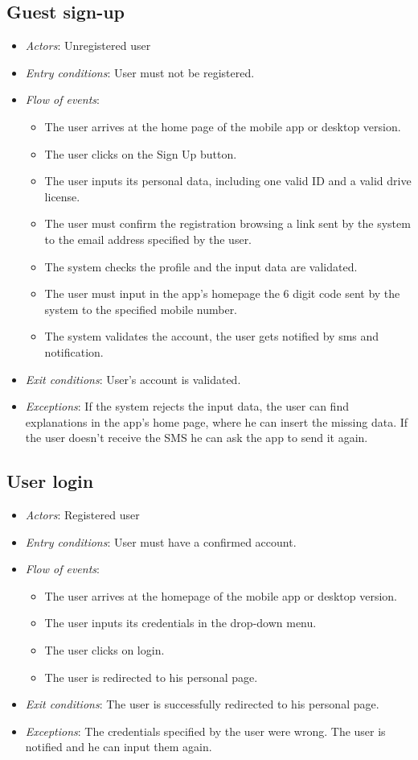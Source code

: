 \subsection{Guest sign-up}
\begin{itemize}
	\item \emph{Actors}: Unregistered user
	\item \emph{Entry conditions}: User must not be registered.
	\item \emph{Flow of events}:
	\begin{itemize}
		\item The user arrives at the home page of the mobile app or desktop version.
		\item The user clicks on the Sign Up button.
		\item The user inputs its personal data, including one valid ID and a valid drive license.
		\item The user must confirm the registration browsing a link sent by the system to the email address specified by the user.
		\item The system checks the profile and the input data are validated.
		\item The user must input in the app's homepage the 6 digit code sent by the system to the specified mobile number.
		\item The system validates the account, the user gets notified by sms and notification.
	\end{itemize}
	\item \emph{Exit conditions}: User's account is validated.
	\item \emph{Exceptions}: If the system rejects the input data, the user can find explanations in the app's home page, where he can insert the missing data. If the user doesn't receive the SMS he can ask the app to send it again.
\end{itemize}

\subsection{User login}
\begin{itemize}
	\item \emph{Actors}: Registered user
	\item \emph{Entry conditions}: User must have a confirmed account.
	\item \emph{Flow of events}:
	\begin{itemize}
		\item The user arrives at the homepage of the mobile app or desktop version.
		\item The user inputs its credentials in the drop-down menu.
		\item The user clicks on login.
		\item The user is redirected to his personal page.
	\end{itemize}
	\item \emph{Exit conditions}: The user is successfully redirected to his personal page.
	\item \emph{Exceptions}: The credentials specified by the user were wrong. The user is notified and he can input them again.
\end{itemize}

